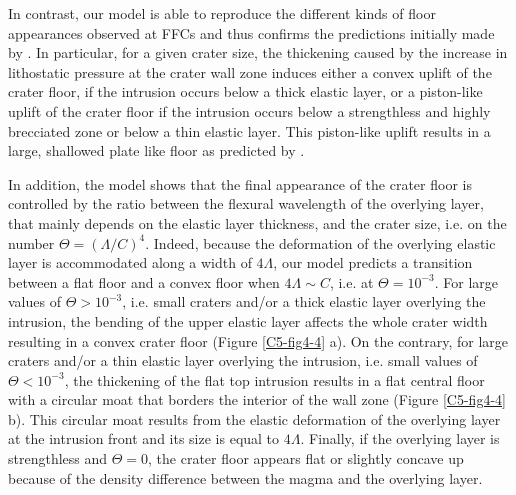 In contrast,  our model is  able to  reproduce the different  kinds of
floor appearances observed  at FFCs and thus  confirms the predictions
initially made by \citet{Schultz:1976kt}.   In particular, for a given
crater  size, the  thickening caused  by the  increase in  lithostatic
pressure at the crater wall zone induces either a convex uplift of the
crater floor, if the intrusion occurs  below a thick elastic layer, or
a piston-like uplift of the crater floor if the intrusion occurs below
a  strengthless and  highly brecciated  zone or  below a  thin elastic
layer. This  piston-like uplift  results in  a large,  shallowed plate
like floor as predicted by \citet{Schultz:1976kt}.
	
In addition, the  model shows that the final appearance  of the crater
floor is  controlled by the  ratio between the flexural  wavelength of
the  overlying  layer,  that  mainly  depends  on  the  elastic  layer
thickness,   and    the   crater    size,   i.e.    on    the   number
$\Theta=(\Lambda/C)^4$.   Indeed,  because   the  deformation  of  the
overlying elastic layer  is accommodated along a  width of $4\Lambda$,
our model  predicts a  transition between  a flat  floor and  a convex
floor  when $4\Lambda\sim  C$, i.e.   at $\Theta=10^{-3}$.   For large
values of $\Theta>10^{-3}$, i.e. small  craters and/or a thick elastic
layer overlying the intrusion, the  bending of the upper elastic layer
affects  the whole  crater width  resulting in  a convex  crater floor
(Figure \ref{C5-fig4-4} a).  On the contrary, for large craters and/or
a thin  elastic layer overlying  the intrusion, i.e.  small  values of
$\Theta<10^{-3}$, the thickening of the  flat top intrusion results in
a flat central floor with a circular moat that borders the interior of
the wall zone  (Figure \ref{C5-fig4-4} b). This  circular moat results
from the elastic  deformation of the overlying layer  at the intrusion
front and its size is equal  to $4\Lambda$.  Finally, if the overlying
layer is strengthless and $\Theta=0$, the crater floor appears flat or
slightly  concave up  because of  the density  difference between  the
magma and the overlying layer.
	
